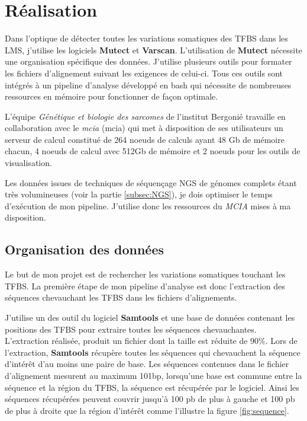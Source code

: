\chapter{Réalisation}

Dans l'optique de détecter toutes les variations somatiques des TFBS dans les LMS, j'utilise les logiciels \textbf{Mutect} et \textbf{Varscan}. L'utilisation de \textbf{Mutect} nécessite une organisation spécifique des données. J'utilise plusieurs outils pour formater les fichiers d'alignement suivant les exigences de celui-ci. Tous ces outils sont intégrés à un pipeline d'analyse développé en bash qui nécessite de nombreuses ressources en mémoire pour fonctionner de façon optimale.

L'équipe \textit{Génétique et biologie des sarcomes} de l'institut Bergonié travaille en collaboration avec le \textit{\acrlong{mcia}} (\acrshort{mcia}) \citep{MCIA} qui met à disposition de ses utilisateurs un serveur de calcul constitué de 264 noeuds de calculs ayant 48 Gb de mémoire chacun, 4 noeuds de calcul avec 512Gb de mémoire et 2 noeuds pour les outils de visualisation.

Les données issues de techniques de séquençage NGS de génomes complets étant très volumineuses (voir la partie \ref{subsec:NGS}), je dois optimiser le temps d'exécution de mon pipeline. J'utilise donc les ressources du \textit{MCIA} mises à ma disposition.

\section{Organisation des données}

Le but de mon projet est de rechercher les variations somatiques touchant les TFBS. La première étape de mon pipeline d'analyse est donc l'extraction des séquences chevauchant les TFBS dans les fichiers d'alignements.

J'utilise un des outil du logiciel \textbf{Samtools} et une base de données contenant les positions des TFBS pour extraire toutes les séquences chevauchantes. L'extraction réalisée, produit un fichier dont la taille est réduite de 90\%. Lors de l'extraction, \textbf{Samtools} récupère toutes les séquences qui chevauchent la séquence d'intérêt d'au moins une paire de base. Les séquences contenues dans le fichier d'alignement mesurent au maximum 101bp, lorsqu'une base est commune entre la séquence et la région du TFBS, la séquence est récupérée par le logiciel. Ainsi les séquences récupérées peuvent couvrir jusqu'à 100 pb de plus à gauche et 100 pb de plus à droite que la région d'intérêt comme l'illustre la figure \ref{fig:sequence}.

